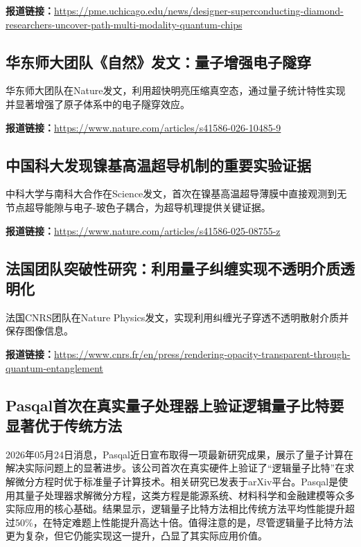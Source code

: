 \documentclass[12pt,a4paper]{ctexart}
\begin{document}
\noindent\textbf{报道链接：}\url{https://pme.uchicago.edu/news/designer-superconducting-diamond-researchers-uncover-path-multi-modality-quantum-chips }

\subsection{ 华东师大团队《自然》发文：量子增强电子隧穿 }

华东师大团队在Nature发文，利用超快明亮压缩真空态，通过量子统计特性实现并显著增强了原子体系中的电子隧穿效应。

\noindent\textbf{报道链接：}\url{https://www.nature.com/articles/s41586-026-10485-9 }

\subsection{ 中国科大发现镍基高温超导机制的重要实验证据 }

中科大学与南科大合作在Science发文，首次在镍基高温超导薄膜中直接观测到无节点超导能隙与电子-玻色子耦合，为超导机理提供关键证据。

\noindent\textbf{报道链接：}\url{https://www.nature.com/articles/s41586-025-08755-z }

\subsection{ 法国团队突破性研究：利用量子纠缠实现不透明介质透明化 }

法国CNRS团队在Nature Physics发文，实现利用纠缠光子穿透不透明散射介质并保存图像信息。

\noindent\textbf{报道链接：}\url{https://www.cnrs.fr/en/press/rendering-opacity-transparent-through-quantum-entanglement }

\subsection{ Pasqal首次在真实量子处理器上验证逻辑量子比特要显著优于传统方法 }

2026年05月24日消息，Pasqal近日宣布取得一项最新研究成果，展示了量子计算在解决实际问题上的显著进步。该公司首次在真实硬件上验证了“逻辑量子比特”在求解微分方程时优于标准量子计算技术。相关研究已发表于arXiv平台。Pasqal是使用其量子处理器求解微分方程，这类方程是能源系统、材料科学和金融建模等众多实际应用的核心基础。结果显示，逻辑量子比特方法相比传统方法平均性能提升超过50\%，在特定难题上性能提升高达十倍。值得注意的是，尽管逻辑量子比特方法更为复杂，但它仍能实现这一提升，凸显了其实际应用价值。
\end{document}
